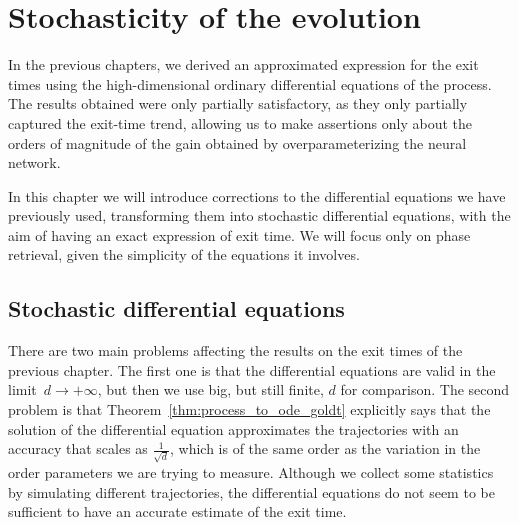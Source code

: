 \chapter{Stochasticity of the evolution}\label{chap:stochasticity}
In the previous chapters, we derived an approximated expression for the exit times using the high-dimensional
ordinary differential equations of the process.
The results obtained were only partially satisfactory, as they only partially captured the exit-time trend,
allowing us to make assertions only about the orders of magnitude of the gain obtained by overparameterizing the neural network.

In this chapter we will introduce corrections to the differential equations we have previously used,
transforming them into stochastic differential equations, with the aim of having an exact expression of exit time.
We will focus only on phase retrieval, given the simplicity of the equations it involves. 

\section{Stochastic differential equations}
There are two main problems affecting the results on the exit times of the previous chapter.
The first one is that the differential equations are valid in the limit~\(d\to+\infty\),
but then we use big, but still finite, \(d\) for comparison. 
The second problem is that Theorem~\ref{thm:process_to_ode_goldt} explicitly says that the solution of the differential equation approximates the trajectories with an accuracy that scales as \(\frac{1}{\sqrt{d}}\),
which is of the same order as the variation in the order parameters we are trying to measure.
Although we collect some statistics by simulating different trajectories,
the differential equations do not seem to be sufficient to have an accurate estimate of the exit time.

